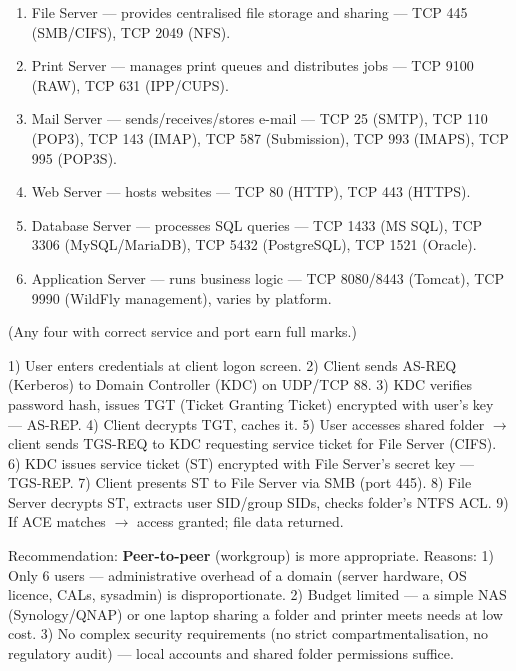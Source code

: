 \documentclass[11pt]{article}
\begin{document}
\begin{corrige}[Exercise 2]
\begin{enumerate}
\item File Server — provides centralised file storage and sharing — TCP 445 (SMB/CIFS), TCP 2049 (NFS).
\item Print Server — manages print queues and distributes jobs — TCP 9100 (RAW), TCP 631 (IPP/CUPS).
\item Mail Server — sends/receives/stores e-mail — TCP 25 (SMTP), TCP 110 (POP3), TCP 143 (IMAP), TCP 587 (Submission), TCP 993 (IMAPS), TCP 995 (POP3S).
\item Web Server — hosts websites — TCP 80 (HTTP), TCP 443 (HTTPS).
\item Database Server — processes SQL queries — TCP 1433 (MS SQL), TCP 3306 (MySQL/MariaDB), TCP 5432 (PostgreSQL), TCP 1521 (Oracle).
\item Application Server — runs business logic — TCP 8080/8443 (Tomcat), TCP 9990 (WildFly management), varies by platform.
\end{enumerate}
(Any four with correct service and port earn full marks.)
\end{corrige}

\begin{corrige}[Exercise 3]
1) User enters credentials at client logon screen. 2) Client sends AS-REQ (Kerberos) to Domain Controller (KDC) on UDP/TCP 88. 3) KDC verifies password hash, issues TGT (Ticket Granting Ticket) encrypted with user's key — AS-REP. 4) Client decrypts TGT, caches it. 5) User accesses shared folder $\rightarrow$ client sends TGS-REQ to KDC requesting service ticket for File Server (CIFS). 6) KDC issues service ticket (ST) encrypted with File Server's secret key — TGS-REP. 7) Client presents ST to File Server via SMB (port 445). 8) File Server decrypts ST, extracts user SID/group SIDs, checks folder's NTFS ACL. 9) If ACE matches $\rightarrow$ access granted; file data returned.
\end{corrige}

\begin{corrige}[Exercise 4]
Recommendation: \textbf{Peer-to-peer} (workgroup) is more appropriate.
Reasons: 1) Only 6 users — administrative overhead of a domain (server hardware, OS licence, CALs, sysadmin) is disproportionate. 2) Budget limited — a simple NAS (Synology/QNAP) or one laptop sharing a folder and printer meets needs at low cost. 3) No complex security requirements (no strict compartmentalisation, no regulatory audit) — local accounts and shared folder permissions suffice.
\end{corrige}
\end{document}
